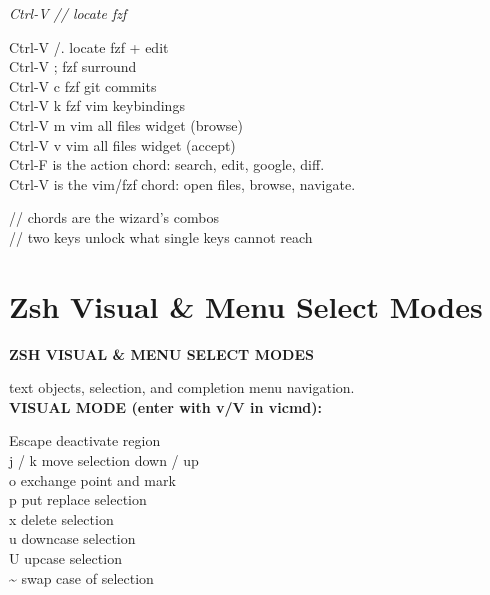 \documentclass[11pt,a4paper,twoside]{book}
\begin{document}
{\small\itshape\color{dimtext} Ctrl-V //             locate fzf}

Ctrl-V /.             locate fzf + edit\\
Ctrl-V ;              fzf surround\\
Ctrl-V c              fzf git commits\\
Ctrl-V k              fzf vim keybindings\\
Ctrl-V m              vim all files widget (browse)\\
Ctrl-V v              vim all files widget (accept)\\

Ctrl-F is the action chord: search, edit, google, diff.\\
Ctrl-V is the vim/fzf chord: open files, browse, navigate.\\

\begin{codebox}
\color{neongreen}// chords are the wizard's combos\\
\color{neongreen}// two keys unlock what single keys cannot reach\\
\end{codebox}


\vspace{16pt}

\section{Zsh Visual \& Menu Select Modes}


\vspace{10pt}
{\large\bfseries\color{neoncyan} ZSH VISUAL \& MENU SELECT MODES}\vspace{6pt}

text objects, selection, and completion menu navigation.\\


\vspace{12pt}
{\bfseries\color{neonyellow} \textbf{VISUAL} MODE (enter with v/V in vicmd):}\vspace{4pt}

Escape                deactivate region\\
j / k                move selection down / up\\
o                     exchange point and mark\\
p                     put replace selection\\
x                     delete selection\\
u                     downcase selection\\
U                     upcase selection\\
\textasciitilde{}                     swap case of selection\\
\end{document}
